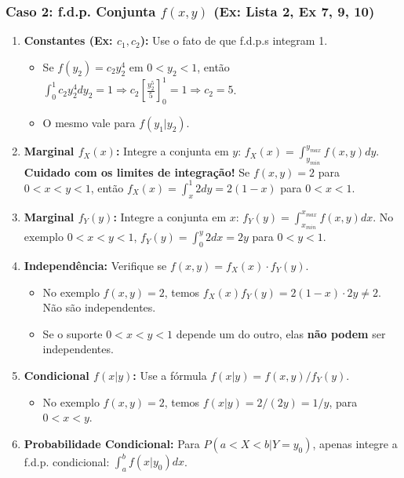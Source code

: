 \subsubsection{Caso 2: f.d.p. Conjunta $f(x,y)$ (Ex: Lista 2, Ex 7, 9, 10)}
\begin{enumerate}
    \item \textbf{Constantes (Ex: $c_1, c_2$):} Use o fato de que f.d.p.s integram 1.
    \begin{itemize}
        \item Se $f(y_2) = c_2 y_2^4$ em $0 < y_2 < 1$, então $\int_0^1 c_2 y_2^4 dy_2 = 1 \Rightarrow c_2 [\frac{y_2^5}{5}]_0^1 = 1 \Rightarrow c_2 = 5$.
        \item O mesmo vale para $f(y_1|y_2)$.
    \end{itemize}
    \item \textbf{Marginal $f_X(x)$:} Integre a conjunta em $y$: $f_X(x) = \int_{y_{min}}^{y_{max}} f(x,y) dy$. \textbf{Cuidado com os limites de integração!} Se $f(x,y)=2$ para $0<x<y<1$, então $f_X(x) = \int_x^1 2 dy = 2(1-x)$ para $0<x<1$.
    \item \textbf{Marginal $f_Y(y)$:} Integre a conjunta em $x$: $f_Y(y) = \int_{x_{min}}^{x_{max}} f(x,y) dx$. No exemplo $0<x<y<1$, $f_Y(y) = \int_0^y 2 dx = 2y$ para $0<y<1$.
    \item \textbf{Independência:} Verifique se $f(x,y) = f_X(x) \cdot f_Y(y)$.
    \begin{itemize}
        \item No exemplo $f(x,y)=2$, temos $f_X(x)f_Y(y) = 2(1-x) \cdot 2y \neq 2$. Não são independentes.
        \item Se o suporte $0<x<y<1$ depende um do outro, elas \textbf{não podem} ser independentes.
    \end{itemize}
    \item \textbf{Condicional $f(x|y)$:} Use a fórmula $f(x|y) = f(x,y) / f_Y(y)$.
    \begin{itemize}
        \item No exemplo $f(x,y)=2$, temos $f(x|y) = 2 / (2y) = 1/y$, para $0<x<y$.
    \end{itemize}
    \item \textbf{Probabilidade Condicional:} Para $P(a < X < b | Y=y_0)$, apenas integre a f.d.p. condicional: $\int_a^b f(x | y_0) dx$.
\end{enumerate}